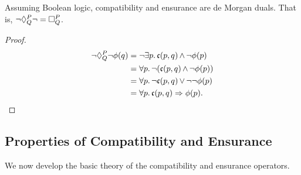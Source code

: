     \begin{claim}
    Assuming Boolean logic, compatibility and ensurance are de Morgan duals. That is, $\neg \compat{P}{Q} \neg = \ensure{P}{Q}$.
    \end{claim}
    \begin{proof}
    \begin{align*}
        \neg \compat{P}{Q} \neg \phi(q) &= \neg \exists p.\, \mathfrak{c}(p, q) \meet \neg \phi(p) \\
            &= \forall p.\, \neg (\mathfrak{c}(p, q) \meet \neg \phi(p)) \\
            &= \forall p.\, \neg \mathfrak{c}(p, q) \join \neg\neg \phi(p) \\
            &= \forall p.\, \mathfrak{c}(p, q) \Rightarrow \phi(p).
    \end{align*}
    \end{proof}
    
\subsection{Properties of Compatibility and Ensurance}
We now develop the basic theory of the compatibility and ensurance operators.    
    
